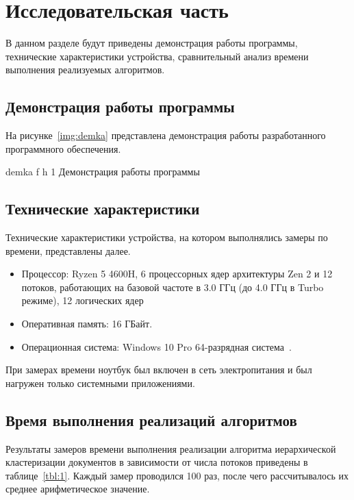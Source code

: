 \chapter{Исследовательская часть}

В данном разделе будут приведены демонстрация работы программы, технические характеристики устройства, сравнительный анализ времени выполнения реализуемых алгоритмов.

\section{Демонстрация работы программы}

На рисунке~\ref{img:demka} представлена демонстрация работы разработанного программного обеспечения.

{demka} %
{f} %
{h} %
{1\textwidth} %
{Демонстрация работы программы} %

\section{Технические характеристики}

Технические характеристики устройства, на котором выполнялись замеры по времени, представлены далее.

\begin{itemize}
	\item Процессор: Ryzen 5 4600H, 6 процессорных ядер архитектуры Zen 2 и 12 потоков, работающих на базовой частоте в 3.0 ГГц (до 4.0 ГГц в Turbo режиме), 12 логических ядер~\cite{ryzen}
	\item Оперативная память: 16 ГБайт.
	\item Операционная система: Windows 10 Pro 64-разрядная система~\cite{windows}.
\end{itemize}

При замерах времени ноутбук был включен в сеть электропитания и был нагружен только системными приложениями.


\section{Время выполнения реализаций алгоритмов}

Результаты замеров времени выполнения реализации алгоритма иерархической кластеризации документов в зависимости от числа потоков приведены в таблице~\ref{tbl:1}.
Каждый замер проводился 100 раз, после чего рассчитывалось их среднее арифметическое значение.

